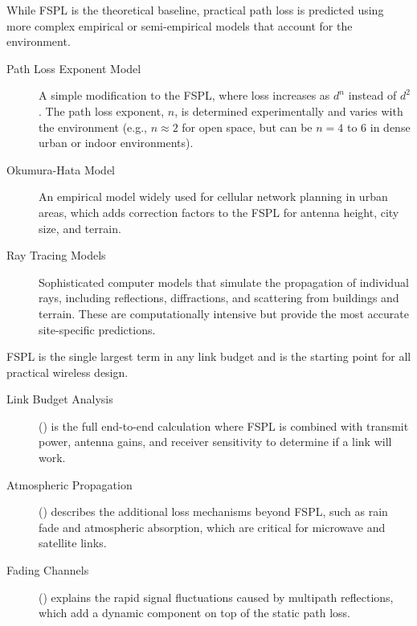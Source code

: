 While FSPL is the theoretical baseline, practical path loss is predicted using more complex empirical or semi-empirical models that account for the environment.
\begin{description}
    \item[Path Loss Exponent Model] A simple modification to the FSPL, where loss increases as $d^n$ instead of $d^2$. The path loss exponent, $n$, is determined experimentally and varies with the environment (e.g., $n \approx 2$ for open space, but can be $n=4$ to $6$ in dense urban or indoor environments).
    \item[Okumura-Hata Model] An empirical model widely used for cellular network planning in urban areas, which adds correction factors to the FSPL for antenna height, city size, and terrain.
    \item[Ray Tracing Models] Sophisticated computer models that simulate the propagation of individual rays, including reflections, diffractions, and scattering from buildings and terrain. These are computationally intensive but provide the most accurate site-specific predictions.
\end{description}


\begin{importantbox}[title={Further Reading}]
    FSPL is the single largest term in any link budget and is the starting point for all practical wireless design.
    \begin{description}
        \item[Link Budget Analysis] () is the full end-to-end calculation where FSPL is combined with transmit power, antenna gains, and receiver sensitivity to determine if a link will work.
        \item[Atmospheric Propagation] () describes the additional loss mechanisms beyond FSPL, such as rain fade and atmospheric absorption, which are critical for microwave and satellite links.
        \item[Fading Channels] () explains the rapid signal fluctuations caused by multipath reflections, which add a dynamic component on top of the static path loss.
    \end{description}
\end{importantbox}
